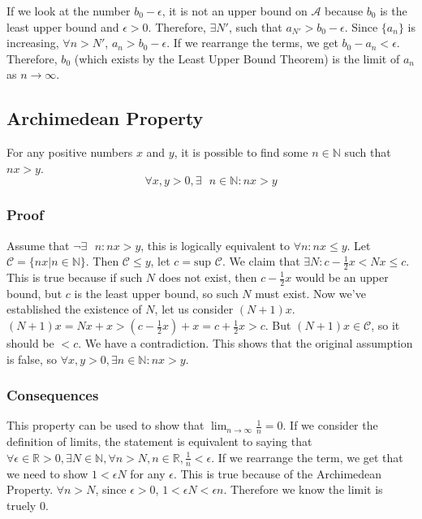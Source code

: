 \documentclass[11 pt, twoside]{article}
\begin{document}
If we look at the number $b_0 - \epsilon$, it is not an upper bound on
$\mathcal{A}$ because $b_0$ is the least upper bound and $\epsilon > 0$.
Therefore, $\exists N'$, such that $a_{N'} > b_0 - \epsilon$. Since $\{a_n\}$ is increasing,
$\forall n > N'$, $a_n > b_0 - \epsilon$. If we rearrange the terms, we get $b_0
- a_n < \epsilon$. Therefore, $b_0$ (which exists by the Least Upper Bound
Theorem) is the limit of $a_n$ as $n \to \infty$.

\subsection{Archimedean Property}

For any positive numbers $x$ and $y$, it is possible to find some $n \in
\mathbb{N}$ such that $nx > y$.
$$\forall x, y > 0, \exists\text{ } n \in \mathbb{N}: nx > y$$

\subsubsection{Proof}
Assume that $\neg \exists\text{ } n:nx > y$, this is logically equivalent to
$\forall n: nx \leq y$. Let $\mathcal{C} = \{nx | n \in \mathbb{N}\}$. Then
$\mathcal{C} \leq y$, let $c = \text{sup } \mathcal{C}$.
We claim that $\exists N: c-\frac{1}{2}x < Nx \leq c$. This is true because if
such $N$ does not exist, then $c - \frac{1}{2}x$ would be an upper bound, but
$c$ is the least upper bound, so such $N$ must exist.
Now we've established the existence of $N$, let us consider $(N + 1)x$. $(N +
1)x = Nx + x > (c - \frac{1}{2}x) + x = c + \frac{1}{2}x > c$. But $(N + 1)x \in
\mathcal{C}$, so it should be $< c$. We have a contradiction. This shows that
the original assumption is false, so $\forall x, y > 0, \exists n \in
\mathbb{N}: nx > y$.

\subsubsection{Consequences}
This property can be used to show that $\lim_{n\to\infty} \frac{1}{n} = 0$.
If we consider the definition of limits, the statement is equivalent to saying
that $\forall \epsilon \in \mathbb{R} > 0, \exists N \in \mathbb{N},
\forall n > N, n \in \mathbb{R}, \frac{1}{n} < \epsilon$.
If we rearrange the term, we get that we need to show $1 < \epsilon N$ for any
$\epsilon$. This is true because of the Archimedean Property. $\forall n > N$,
since $\epsilon > 0$, $1 < \epsilon N < \epsilon n$. Therefore we know the limit
is truely 0.
\end{document}
